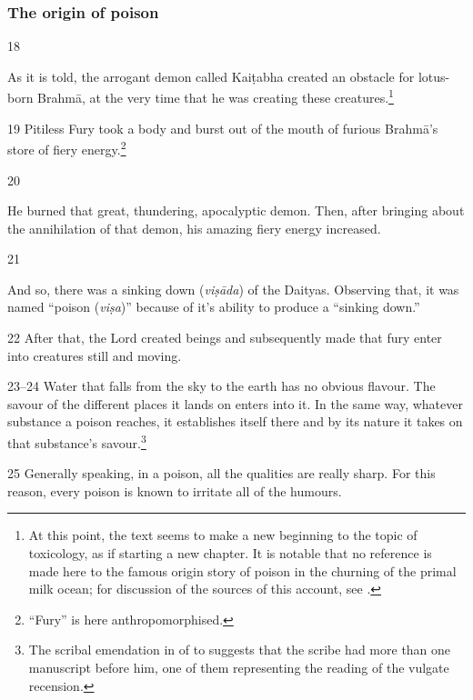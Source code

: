 \subsubsection{The origin of poison}

\begin{translation}[resume]

\item [18]

As it is told, the arrogant demon called Kaiṭabha created an obstacle for
lotus-born Brahmā, at the very time that he was creating these creatures.\footnote{At 
this point, the text seems to make a new beginning to the topic of toxicology, as if 
starting a new chapter.  It is notable that no reference is made here to 
the famous origin story of poison in the churning of the primal milk ocean; for 
discussion of the sources of this account, see \cite{bede-1967}.}

\item[19]
Pitiless Fury took a body and burst out of the mouth of furious Brahmā's store of fiery 
energy.\footnote{“Fury” is here anthropomorphised.}

\item[20]

He burned that great, thundering, apocalyptic demon.   Then, after bringing about
the annihilation of that demon, his amazing fiery energy increased.

\item [21]

And so, there was a sinking down (\emph{viṣāda}) of the Daityas.   Observing that,
it was named “poison (\emph{viṣa})” because of it's ability to produce a “sinking
down.”

\item [22] After that, the Lord created beings and subsequently made that fury
enter into creatures still and moving.

\item [23--24] Water that falls from the sky to the earth has no obvious flavour.
The savour of the different places it lands on enters into it.  In the same way,
whatever substance a poison reaches, it establishes itself there and by its nature it 
takes on that substance's savour.\footnote{The scribal emendation in  of  to  suggests that the scribe had more than 
one manuscript before him, one of them representing the reading of the vulgate 
recension.}

\item [25] Generally speaking, in a poison, all the qualities are really sharp. 
For this reason, every poison is known to irritate all of the humours.


\end{translation}
